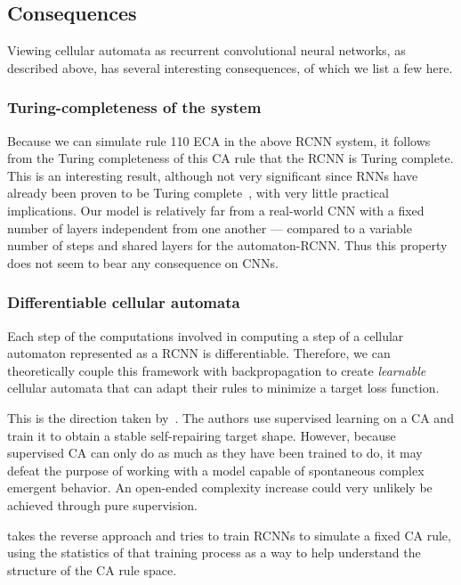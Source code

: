 \subsection{Consequences}

Viewing cellular automata as recurrent convolutional neural networks, as described above, has several interesting consequences, of which we list a few
here.

\subsubsection{Turing-completeness of the system}

Because we can simulate rule 110 ECA in the above RCNN system, it follows from
the Turing completeness of this CA rule that the RCNN is Turing complete. This
is an interesting result, although not very significant since \acp{RNN} have
already been proven to be Turing
complete~\parencite{siegelmannComputationalPowerNeural1992}, with very little
practical implications. Our model is relatively far from a real-world CNN with a
fixed number of layers independent from one another --- compared to a variable
number of steps and shared layers for the automaton-RCNN. Thus this property
does not seem to bear any consequence on \acp{CNN}.

\subsubsection{Differentiable cellular automata}

Each step of the computations involved in computing a step of a cellular
automaton represented as a RCNN is differentiable. Therefore, we can
theoretically couple this framework with backpropagation to create
\emph{learnable} cellular automata that can adapt their rules to minimize a
target loss function.

This is the direction taken by~\textcite{mordvintsevGrowingNeuralCellular2020}.
The authors use supervised learning on a \ac{CA} and train it to obtain a stable
self-repairing target shape. However, because supervised \ac{CA} can only do as
much as they have been trained to do, it may defeat the purpose of working with
a model capable of spontaneous complex emergent behavior. An open-ended
complexity increase could very unlikely be achieved through pure supervision.

\textcite{gilpinCellularAutomataConvolutional2018} takes the reverse approach
and tries to train RCNNs to simulate a fixed \ac{CA} rule, using the statistics
of that training process as a way to help understand the structure of the
\ac{CA} rule space.

